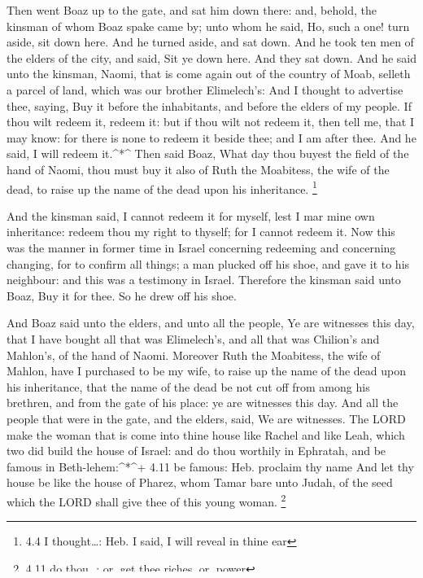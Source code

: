  Then went Boaz up to the gate, and sat him down there: and,
behold, the kinsman of whom Boaz spake came by; unto whom he said, Ho,
such a one! turn aside, sit down here. And he turned aside, and sat
down.  And he took ten men of the elders of the city, and
said, Sit ye down here. And they sat down.  And he said unto
the kinsman, Naomi, that is come again out of the country of Moab,
selleth a parcel of land, which was our brother Elimelech's:
 And I thought to advertise thee, saying, Buy it before the
inhabitants, and before the elders of my people. If thou wilt redeem it,
redeem it: but if thou wilt not redeem it, then tell me, that I may
know: for there is none to redeem it beside thee; and I am after thee.
And he said, I will redeem it.\^{}*\^{}  Then said Boaz,
What day thou buyest the field of the hand of Naomi, thou must buy it
also of Ruth the Moabitess, the wife of the dead, to raise up the name
of the dead upon his inheritance. \footnote{4.4 I thought\ldots: Heb. I
  said, I will reveal in thine ear}

 And the kinsman said, I cannot redeem it for myself, lest I
mar mine own inheritance: redeem thou my right to thyself; for I cannot
redeem it.  Now this was the manner in former time in Israel
concerning redeeming and concerning changing, for to confirm all things;
a man plucked off his shoe, and gave it to his neighbour: and this was a
testimony in Israel.  Therefore the kinsman said unto Boaz,
Buy it for thee. So he drew off his shoe.

 And Boaz said unto the elders, and unto all the people, Ye
are witnesses this day, that I have bought all that was Elimelech's, and
all that was Chilion's and Mahlon's, of the hand of Naomi. 
Moreover Ruth the Moabitess, the wife of Mahlon, have I purchased to be
my wife, to raise up the name of the dead upon his inheritance, that the
name of the dead be not cut off from among his brethren, and from the
gate of his place: ye are witnesses this day.  And all the
people that were in the gate, and the elders, said, We are witnesses.
The LORD make the woman that is come into thine house like Rachel and
like Leah, which two did build the house of Israel: and do thou worthily
in Ephratah, and be famous in Beth-lehem:\^{}*\^{}+ 4.11 be famous: Heb.
proclaim thy name  And let thy house be like the house of
Pharez, whom Tamar bare unto Judah, of the seed which the LORD shall
give thee of this young woman. \footnote{4.11 do thou\ldots: or, get
  thee riches, or, power}

